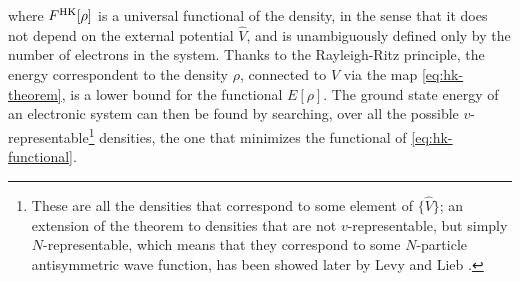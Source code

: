 %
where $F^{\rm HK}[\rho]$ is a universal functional of the density, in the sense that it does not depend on the external potential $\hat{V}$, and is unambiguously defined only by the number of electrons in the system. Thanks to the Rayleigh-Ritz principle, the energy correspondent to the density $\rho$, connected to $\hat{V}$ via the map \eqref{eq:hk-theorem}, is a lower bound for the functional $E[\rho]$. The ground state energy of an electronic system can then be found by searching, over all the possible $v$-representable\footnote{These are all the densities that correspond to some element of $\{ \hat{V} \}$; an extension of the theorem to densities that are not $v$-representable, but simply $N$-representable, which means that they correspond to some $N$-particle antisymmetric wave function, has been showed later by Levy \cite{levy_electron_1982} and Lieb \cite{shimony_physics_1982}.} densities, the one that minimizes the functional of \cref{eq:hk-functional}.

